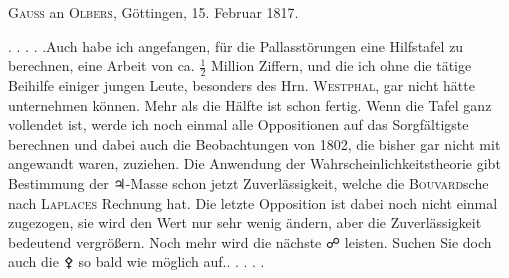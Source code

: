\par{}\bigskip
\begin{center}
\textsc{Gauss} an \textsc{Olbers}, Göttingen, 15. Februar 1817.
\end{center}
\noindent\hspace*{\parindent}. . . . .\quad Auch habe ich angefangen, für die Pallasstörungen eine Hilfstafel zu berechnen, eine Arbeit von ca. \(\frac{1}{2}\) Million Ziffern, und die ich ohne die tätige Beihilfe einiger jungen Leute, besonders des Hrn. \textsc{Westphal}, gar nicht hätte unternehmen können. Mehr als die Hälfte ist schon fertig. Wenn die Tafel ganz vollendet ist, werde ich noch einmal alle Oppositionen auf das Sorgfältigste berechnen und dabei auch die Beobachtungen von 1802, die bisher gar nicht mit angewandt waren, zuziehen. Die Anwendung der Wahrscheinlichkeitstheorie gibt  Bestimmung der {\AstroSymbols ♃}-Masse schon jetzt  Zuverlässigkeit, welche die \textsc{Bouvard}sche nach \textsc{Laplaces} Rechnung hat. Die letzte Opposition ist dabei noch nicht einmal zugezogen, sie wird den Wert nur sehr wenig ändern, aber die Zuverlässigkeit bedeutend vergrößern. Noch mehr wird die nächste {\AstroSymbols ☍} leisten. Suchen Sie doch auch die {\AstroSymbols ⚴} so bald wie möglich auf.\quad . . . . .
\par
